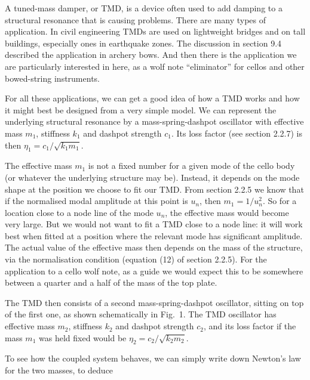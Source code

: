   A tuned-mass damper, or TMD, is a device often used to add damping to a 
  structural resonance that is causing problems. There are many types of 
  application. In civil engineering TMDs are used on lightweight bridges and on 
  tall buildings, especially ones in earthquake zones. The discussion in 
  section 9.4 described the application in archery bows. And then there is the 
  application we are particularly interested in here, as a wolf note 
  ``eliminator'' for cellos and other bowed-string instruments. 

  For all these applications, we can get a good idea of how a TMD works and how 
  it might best be designed from a very simple model. We can represent the 
  underlying structural resonance by a mass-spring-dashpot oscillator with 
  effective mass $m_1$, stiffness $k_1$ and dashpot strength $c_1$. Its loss 
  factor (see section 2.2.7) is then $\eta_1=c_1/\sqrt{k_1 m_1}$. 

  The effective mass $m_1$ is not a fixed number for a given mode of the cello 
  body (or whatever the underlying structure may be). Instead, it depends on 
  the mode shape at the position we choose to fit our TMD. From section 2.2.5 
  we know that if the normalised modal amplitude at this point is $u_n$, then 
  $m_1=1/u_n^2$. So for a location close to a node line of the mode $u_n$, the 
  effective mass would become very large. But we would not want to fit a TMD 
  close to a node line: it will work best when fitted at a position where the 
  relevant mode has significant amplitude. The actual value of the effective 
  mass then depends on the mass of the structure, via the normalisation 
  condition (equation (12) of section 2.2.5). For the application to a cello 
  wolf note, as a guide we would expect this to be somewhere between a quarter 
  and a half of the mass of the top plate. 

  The TMD then consists of a second mass-spring-dashpot oscillator, sitting on 
  top of the first one, as shown schematically in Fig.\ 1. The TMD oscillator 
  has effective mass $m_2$, stiffness $k_2$ and dashpot strength $c_2$, and its 
  loss factor if the mass $m_1$ was held fixed would be $\eta_2=c_2/\sqrt{k_2 
  m_2}$. 


  To see how the coupled system behaves, we can simply write down Newton's law 
  for the two masses, to deduce 

